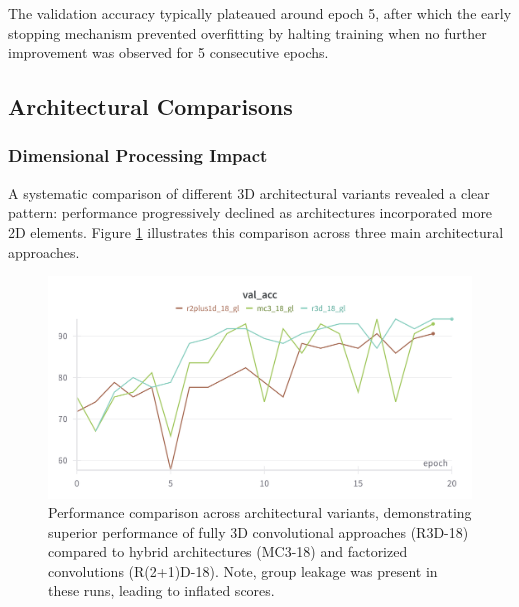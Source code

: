 \documentclass[12pt, a4paper]{article}
\begin{document}
The validation accuracy typically plateaued around epoch 5, after which the early stopping mechanism prevented overfitting by halting training when no further improvement was observed for 5 consecutive epochs.

\subsection{Architectural Comparisons}

\subsubsection{Dimensional Processing Impact}

A systematic comparison of different 3D architectural variants revealed a clear pattern: performance progressively declined as architectures incorporated more 2D elements. Figure \ref{fig:architecture_comparison_gl} illustrates this comparison across three main architectural approaches.

\begin{figure}[htbp]
  \centering
  \includegraphics[width=\textwidth]{figures/archs_acc_gl.png}
  \caption{Performance comparison across architectural variants, demonstrating superior performance of fully 3D convolutional approaches (R3D-18) compared to hybrid architectures (MC3-18) and factorized convolutions (R(2+1)D-18). Note, group leakage was present in these runs, leading to inflated scores.}
  \label{fig:architecture_comparison_gl}
\end{figure}
\end{document}
